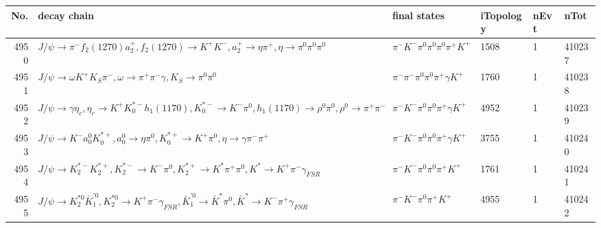 \begin{table}[htbp] 
\begin{center}
\begin{small}
\begin{tabular}{rlllll}\hline\hline
 No. & decay chain & final states &  iTopology & nEvt & nTot \\\hline
4950&$J/\psi       \rightarrow \pi^{-}        f_{2}(1270)    a_{2}^{+}      , f_{2}(1270)     \rightarrow K^{+}          K^{-}          , a_{2}^{+}       \rightarrow \eta          \pi^{+}        , \eta           \rightarrow \pi^{0}        \pi^{0}        \pi^{0}        $&$\pi^{-}        K^{-}          \pi^{0}        \pi^{0}        \pi^{0}        \pi^{+}        K^{+}          $& 1508&    1&410237\\
4951&$J/\psi       \rightarrow \omega         K^{+}          K_{S}          \pi^{-}        , \omega          \rightarrow \pi^{+}        \pi^{-}        \gamma       , K_{S}           \rightarrow \pi^{0}        \pi^{0}        $&$\pi^{-}        \pi^{-}        \pi^{0}        \pi^{0}        \pi^{+}        \gamma       K^{+}          $& 1760&    1&410238\\
4952&$J/\psi       \rightarrow \gamma       \eta_{c}    , \eta_{c}     \rightarrow K^{+}          K_{0}^{*-}     h_{1}(1170)    , K_{0}^{*-}      \rightarrow K^{-}          \pi^{0}        , h_{1}(1170)     \rightarrow \rho^{0}      \pi^{0}        , \rho^{0}       \rightarrow \pi^{+}        \pi^{-}        $&$\pi^{-}        K^{-}          \pi^{0}        \pi^{0}        \pi^{+}        \gamma       K^{+}          $& 4952&    1&410239\\
4953&$J/\psi       \rightarrow K^{-}          a_{0}^{0}      K_{0}^{*+}     , a_{0}^{0}       \rightarrow \eta          \pi^{0}        , K_{0}^{*+}      \rightarrow K^{+}          \pi^{0}        , \eta           \rightarrow \gamma       \pi^{-}        \pi^{+}        $&$\pi^{-}        K^{-}          \pi^{0}        \pi^{0}        \pi^{+}        \gamma       K^{+}          $& 3755&    1&410240\\
4954&$J/\psi       \rightarrow K_2^{*-}       K_2^{*+}       , K_2^{*-}        \rightarrow K^{-}          \pi^{0}        , K_2^{*+}        \rightarrow K^{*}          \pi^{+}        \pi^{0}        , K^{*}           \rightarrow K^{+}          \pi^{-}        \gamma_{FSR} $&$\pi^{-}        K^{-}          \pi^{0}        \pi^{0}        \pi^{+}        K^{+}          $& 1761&    1&410241\\
4955&$J/\psi       \rightarrow K_2^{*0}       \bar{K}_1^{'0}, K_2^{*0}        \rightarrow K^{+}          \pi^{-}        \gamma_{FSR} , \bar{K}_1^{'0} \rightarrow \bar{K}^{*}   \pi^{0}        , \bar{K}^{*}    \rightarrow K^{-}          \pi^{+}        \gamma_{FSR} $&$\pi^{-}        K^{-}          \pi^{0}        \pi^{+}        K^{+}          $& 4955&    1&410242\\

\end{tabular}
\end{small}
\end{center}
\end{table}
